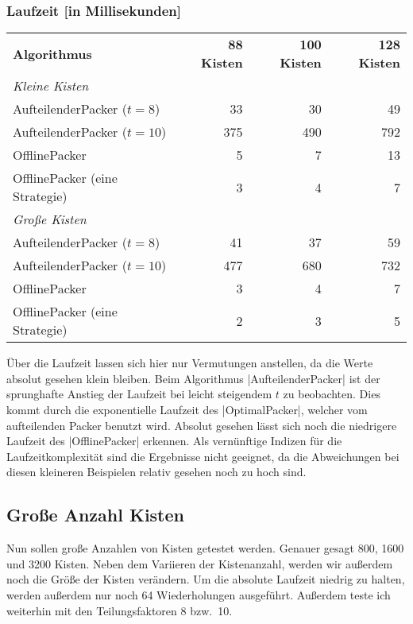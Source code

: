 \subsubsection*{Laufzeit [in Millisekunden]}
\begin{center}
\begin{tabular}{lrrr}
\vspace*{.42em}
\textbf{Algorithmus} 	& \textbf{88 Kisten} 	& \textbf{100 Kisten} 	& \textbf{128 Kisten} 	\\
\textit{Kleine Kisten} & & & \\
 AufteilenderPacker ($t=8$)  	& 33		& 30			& 49			\\
 AufteilenderPacker ($t=10$)  	& 375		& 490			& 792			\\
 OfflinePacker			& 5		& 7			& 13			\\
\vspace*{.42em}
 OfflinePacker (eine Strategie)	& 3		& 4			& 7			\\
\textit{Große Kisten} & & & \\
 AufteilenderPacker ($t=8$)  	& 41		& 37			& 59			\\
 AufteilenderPacker ($t=10$)	& 477		& 680			& 732			\\
 OfflinePacker			& 3		& 4			& 7			\\
 OfflinePacker (eine Strategie)	& 2		& 3			& 5			\\
\end{tabular}
\end{center}
 Über die Laufzeit lassen sich hier nur Vermutungen anstellen, da die Werte absolut gesehen klein bleiben.
 Beim Algorithmus |AufteilenderPacker| ist der sprunghafte Anstieg der Laufzeit bei leicht steigendem $t$ zu beobachten.
 Dies kommt durch die exponentielle Laufzeit des |OptimalPacker|, welcher vom aufteilenden Packer benutzt wird.
 Absolut gesehen lässt sich noch die niedrigere Laufzeit des |OfflinePacker| erkennen.
 Als vernünftige Indizen für die Laufzeitkomplexität sind die Ergebnisse nicht geeignet,
  da die Abweichungen bei diesen kleineren Beispielen relativ gesehen noch zu hoch sind.

\clearpage
\subsection{Große Anzahl Kisten}
 Nun sollen große Anzahlen von Kisten getestet werden. Genauer gesagt 800, 1600 und 3200 Kisten.
 Neben dem Variieren der Kistenanzahl, werden wir außerdem noch die Größe der Kisten verändern.
 Um die absolute Laufzeit niedrig zu halten, werden außerdem nur noch 64 Wiederholungen ausgeführt.
 Außerdem teste ich weiterhin mit den Teilungsfaktoren 8 bzw.\ 10.

